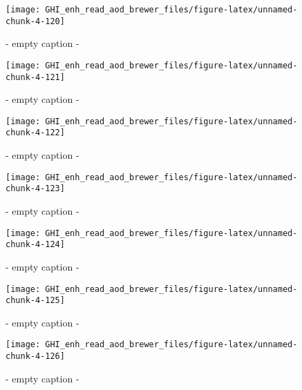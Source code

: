 \documentclass[
  10pt,
  a4paper,oneside]{article}
\begin{document}
\begin{figure}[H]

{\centering \texttt{[image: GHI\_enh\_read\_aod\_brewer\_files/figure-latex/unnamed-chunk-4-120]} 

}

\caption{ - empty caption - }\label{fig:unnamed-chunk-4-120}
\end{figure}
\begin{figure}[H]

{\centering \texttt{[image: GHI\_enh\_read\_aod\_brewer\_files/figure-latex/unnamed-chunk-4-121]} 

}

\caption{ - empty caption - }\label{fig:unnamed-chunk-4-121}
\end{figure}
\begin{figure}[H]

{\centering \texttt{[image: GHI\_enh\_read\_aod\_brewer\_files/figure-latex/unnamed-chunk-4-122]} 

}

\caption{ - empty caption - }\label{fig:unnamed-chunk-4-122}
\end{figure}
\begin{figure}[H]

{\centering \texttt{[image: GHI\_enh\_read\_aod\_brewer\_files/figure-latex/unnamed-chunk-4-123]} 

}

\caption{ - empty caption - }\label{fig:unnamed-chunk-4-123}
\end{figure}
\begin{figure}[H]

{\centering \texttt{[image: GHI\_enh\_read\_aod\_brewer\_files/figure-latex/unnamed-chunk-4-124]} 

}

\caption{ - empty caption - }\label{fig:unnamed-chunk-4-124}
\end{figure}
\begin{figure}[H]

{\centering \texttt{[image: GHI\_enh\_read\_aod\_brewer\_files/figure-latex/unnamed-chunk-4-125]} 

}

\caption{ - empty caption - }\label{fig:unnamed-chunk-4-125}
\end{figure}
\begin{figure}[H]

{\centering \texttt{[image: GHI\_enh\_read\_aod\_brewer\_files/figure-latex/unnamed-chunk-4-126]} 

}

\caption{ - empty caption - }\label{fig:unnamed-chunk-4-126}
\end{figure}
\end{document}
